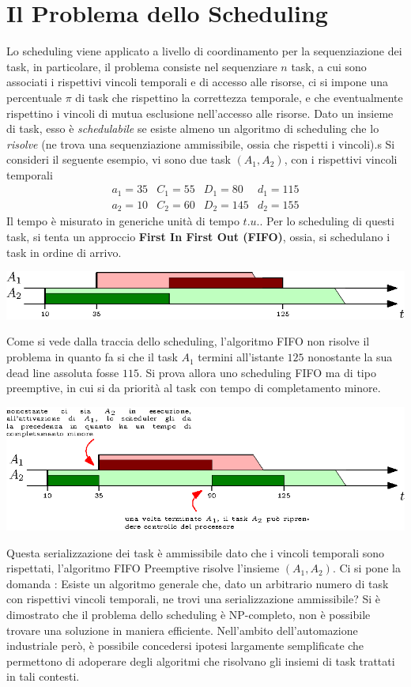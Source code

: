 \documentclass[10pt, letterpaper]{report}
\begin{document}
\section{Il Problema dello Scheduling}
Lo scheduling viene applicato a livello di coordinamento per la sequenziazione dei task, 
in particolare, il problema consiste nel sequenziare $n$ task, a cui sono associati i rispettivi 
vincoli temporali e di accesso alle risorse, ci si impone una percentuale $\pi$ di task che 
rispettino la correttezza temporale, e che eventualmente rispettino i vincoli di mutua 
esclusione nell'accesso alle risorse.\acc 
{} Dato un insieme di task, esso è \textit{schedulabile} se esiste almeno un algoritmo 
di scheduling che lo \textit{risolve} (ne trova una sequenziazione ammissibile, ossia che 
rispetti i vincoli).\acc s
Si consideri il seguente esempio, vi sono due task $(A_1,A_2)$, con i rispettivi vincoli 
temporali
$$\begin{matrix}
    a_1=35 & C_1=55 & D_1=80&d_1=115\\ 
    a_2=10 & C_2=60 & D_2=145&d_2=155
\end{matrix}$$
Il tempo è misurato in generiche unità di tempo $t.u.$. Per lo scheduling di questi task, si tenta un 
approccio \textbf{First In First Out (FIFO)}, ossia, si schedulano i task in ordine di 
arrivo.\begin{center}
    \includegraphics[width=1\textwidth ]{images/esempioFIFO.eps}
\end{center}
Come si vede dalla traccia dello scheduling, l'algoritmo FIFO non risolve il problema in quanto fa 
si che il task $A_1$ termini all'istante $125$ nonostante la sua dead line assoluta fosse $115$. Si prova 
allora uno scheduling FIFO ma di tipo preemptive, in cui si da priorità al task con tempo di completamento 
minore.\begin{center}
    \includegraphics[width=1\textwidth ]{images/esempioFIFOPreemptive.eps}
\end{center}
Questa serializzazione dei task è ammissibile dato che i vincoli temporali sono rispettati, l'algoritmo 
FIFO Preemptive risolve l'insieme $(A_1,A_2)$.\acc 
Ci si pone la domanda : Esiste un algoritmo generale che, dato un arbitrario numero di task con 
rispettivi vincoli temporali, ne trovi una serializzazione ammissibile? Si è dimostrato che il problema 
dello scheduling è NP-completo, non è possibile trovare una soluzione in maniera efficiente. Nell'ambito dell'automazione 
industriale però, è possibile concedersi ipotesi largamente semplificate che permettono di 
adoperare degli algoritmi che risolvano gli insiemi di task trattati in tali contesti.
\end{document}
